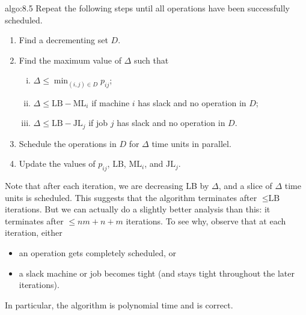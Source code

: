 \begin{algo}{algo:8.5}
    Repeat the following steps until all operations have been successfully scheduled.
    \begin{enumerate}[(1)]
        \item Find a decrementing set $D$. 
        \item Find the maximum value of $\Delta$ such that 
        \begin{enumerate}[(i)]
            \item $\Delta \leq \min_{(i,j) \in D} p_{ij}$;
            \item $\Delta \leq \text{LB} - \text{ML}_i$ if machine $i$ 
            has slack and no operation in $D$; 
            \item $\Delta \leq \text{LB} - \text{JL}_j$ if job $j$ 
            has slack and no operation in $D$. 
        \end{enumerate}
        \item Schedule the operations in $D$ for $\Delta$ time units 
        in parallel. 
        \item Update the values of $p_{ij}$, $\text{LB}$, $\text{ML}_i$, 
        and $\text{JL}_j$. 
    \end{enumerate}
\end{algo}

Note that after each iteration, we are decreasing LB by $\Delta$, 
and a slice of $\Delta$ time units is scheduled. This suggests that 
the algorithm terminates after $\leq \text{LB}$ iterations. But we can actually 
do a slightly better analysis than this: it terminates after $\leq nm + n + m$ 
iterations. To see why, observe that at each iteration, either 
\begin{itemize}
    \item an operation gets completely scheduled, or 
    \item a slack machine or job becomes tight (and stays tight throughout 
    the later iterations).
\end{itemize}
In particular, the algorithm is polynomial time and is correct.  

